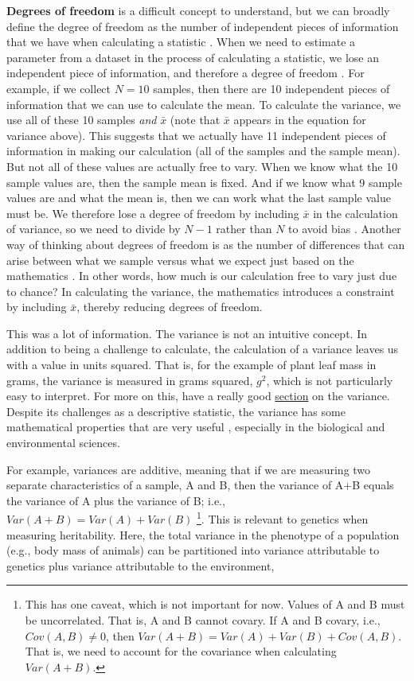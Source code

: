 \documentclass[
  openany]{scrbook}
\begin{document}
\textbf{Degrees of freedom} is a difficult concept to understand, but we can broadly define the degree of freedom as the number of independent pieces of information that we have when calculating a statistic \citep{Grafen2002, Upton2014}.
When we need to estimate a parameter from a dataset in the process of calculating a statistic, we lose an independent piece of information, and therefore a degree of freedom \citep{Pandey2008}.
For example, if we collect \(N = 10\) samples, then there are 10 independent pieces of information that we can use to calculate the mean.
To calculate the variance, we use all of these 10 samples \emph{and} \(\bar{x}\) (note that \(\bar{x}\) appears in the equation for variance above).
This suggests that we actually have 11 independent pieces of information in making our calculation (all of the samples and the sample mean).
But not all of these values are actually free to vary.
When we know what the 10 sample values are, then the sample mean is fixed.
And if we know what 9 sample values are and what the mean is, then we can work what the last sample value must be.
We therefore lose a degree of freedom by including \(\bar{x}\) in the calculation of variance, so we need to divide by \(N - 1\) rather than \(N\) to avoid bias \citep{Wardlaw1985, Fowler1998}.
Another way of thinking about degrees of freedom is as the number of differences that can arise between what we sample versus what we expect just based on the mathematics \citep{Fryer1966}.
In other words, how much is our calculation free to vary just due to chance?
In calculating the variance, the mathematics introduces a constraint by including \(\bar{x}\), thereby reducing degrees of freedom.

This was a lot of information.
The variance is not an intuitive concept.
In addition to being a challenge to calculate, the calculation of a variance leaves us with a value in units squared.
That is, for the example of plant leaf mass in grams, the variance is measured in grams squared, \(g^{2}\), which is not particularly easy to interpret.
For more on this, \citet{Navarro2022} have a really good \href{https://davidfoxcroft.github.io/lsj-book/04-Descriptive-statistics.html\#variance}{section} on the variance.
Despite its challenges as a descriptive statistic, the variance has some mathematical properties that are very useful \citep{Navarro2022}, especially in the biological and environmental sciences.

For example, variances are additive, meaning that if we are measuring two separate characteristics of a sample, A and B, then the variance of A+B equals the variance of A plus the variance of B; i.e., \(Var(A + B) = Var(A) + Var(B)\) \footnote{This has one caveat, which is not important for now. Values of A and B must be uncorrelated. That is, A and B cannot covary. If A and B covary, i.e., \(Cov(A, B) \neq 0\), then \(Var(A+B) = Var(A) + Var(B) + Cov(A, B)\). That is, we need to account for the covariance when calculating \(Var(A+B)\).}.
This is relevant to genetics when measuring heritability.
Here, the total variance in the phenotype of a population (e.g., body mass of animals) can be partitioned into variance attributable to genetics plus variance attributable to the environment,
\end{document}
